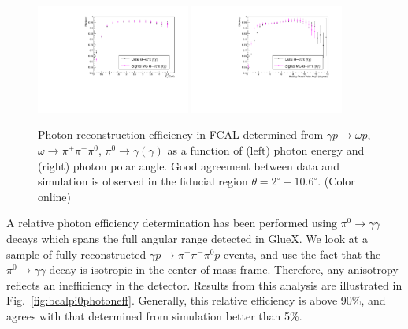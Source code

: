 \begin{figure}[tbp]
\begin{center}
\includegraphics[width=0.45\textwidth]{figures/OmegaCompareE.pdf}
\includegraphics[width=0.45\textwidth]{figures/OmegaCompareTheta.pdf}
\caption{\label{fig:fcalphotoneff}
Photon reconstruction efficiency in FCAL determined from $\gamma p \to \omega p$, $\omega \to \pi^+\pi^-\pi^0$, $\pi^0 \to \gamma (\gamma)$ as a function of (left) photon energy and (right) photon polar angle.  Good agreement between data and simulation is observed in the fiducial region $\theta = 2^\circ - 10.6^\circ$.
 (Color online)}
\end{center}
\end{figure}

A relative photon efficiency determination has been performed using $\pi^0\to\gamma\gamma$ decays which spans the full angular range detected in GlueX.  We look at a sample of fully reconstructed $\gamma p \to  \pi^+\pi^-\pi^0 p$ events, and use the fact that the $\pi^0\to\gamma\gamma$ decay is isotropic in the center of mass frame.  Therefore, any anisotropy reflects an inefficiency in the detector. Results from this analysis are illustrated in Fig.~\ref{fig:bcalpi0photoneff}. Generally, this relative efficiency is above 90\%, and agrees with that determined from simulation better than 5\%.

